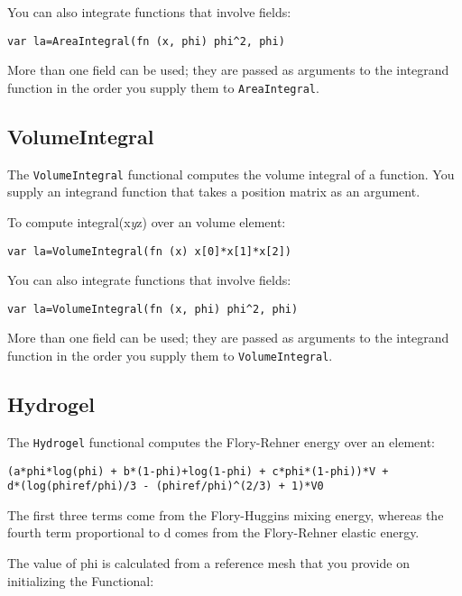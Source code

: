 You can also integrate functions that involve fields:

\begin{lstlisting}
var la=AreaIntegral(fn (x, phi) phi^2, phi)
\end{lstlisting}

More than one field can be used; they are passed as arguments to the
integrand function in the order you supply them to
\texttt{AreaIntegral}.

\hypertarget{volumeintegral}{%
\subsection{VolumeIntegral}\label{volumeintegral}}

The \texttt{VolumeIntegral} functional computes the volume integral of a
function. You supply an integrand function that takes a position matrix
as an argument.

To compute integral(x\emph{y}z) over an volume element:

\begin{lstlisting}
var la=VolumeIntegral(fn (x) x[0]*x[1]*x[2])
\end{lstlisting}

You can also integrate functions that involve fields:

\begin{lstlisting}
var la=VolumeIntegral(fn (x, phi) phi^2, phi)
\end{lstlisting}

More than one field can be used; they are passed as arguments to the
integrand function in the order you supply them to
\texttt{VolumeIntegral}.

\hypertarget{hydrogel}{%
\subsection{Hydrogel}\label{hydrogel}}

The \texttt{Hydrogel} functional computes the Flory-Rehner energy over
an element:

\begin{lstlisting}
(a*phi*log(phi) + b*(1-phi)+log(1-phi) + c*phi*(1-phi))*V + 
d*(log(phiref/phi)/3 - (phiref/phi)^(2/3) + 1)*V0
\end{lstlisting}

The first three terms come from the Flory-Huggins mixing energy, whereas
the fourth term proportional to d comes from the Flory-Rehner elastic
energy.

The value of phi is calculated from a reference mesh that you provide on
initializing the Functional:

